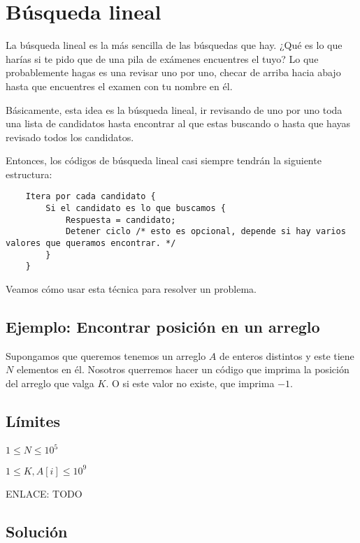 \section{Búsqueda lineal}
La búsqueda lineal es la más sencilla de las búsquedas que hay. ¿Qué es lo que harías si te pido que de una pila de exámenes encuentres el tuyo? Lo que probablemente hagas es una revisar uno por uno, checar de arriba hacia abajo hasta que encuentres el examen con tu nombre en él.

Básicamente, esta idea es la búsqueda lineal, ir revisando de uno por uno toda una lista de candidatos hasta encontrar al que estas buscando o hasta que hayas revisado todos los candidatos.

Entonces, los códigos de búsqueda lineal casi siempre tendrán la siguiente estructura:

\begin{lstlisting}
	Itera por cada candidato {
		Si el candidato es lo que buscamos {
			Respuesta = candidato;
			Detener ciclo /* esto es opcional, depende si hay varios valores que queramos encontrar. */
		}
	}	
\end{lstlisting}

Veamos cómo usar esta técnica para resolver un problema.

\subsection*{Ejemplo: Encontrar posición en un arreglo}

Supongamos que queremos tenemos un arreglo \(A\) de enteros distintos y este tiene \(N\) elementos en él. Nosotros querremos hacer un código que imprima la posición del arreglo que valga \(K\). O si este valor no existe, que imprima \(-1\).

\subsection*{Límites}
\begin{plimits}
	\item \(1\leq N \leq 10^5\)
	\item \(1\leq K,A[i] \leq 10^9\)
\end{plimits}

ENLACE: TODO

\subsection*{Solución}

